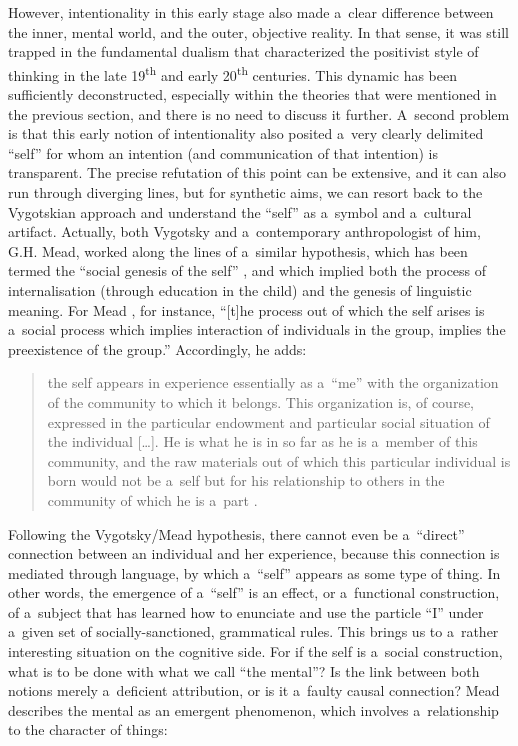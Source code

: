 However, intentionality in this early stage also made a~clear difference between the inner, mental world, and the outer, objective reality. In that sense, it was still trapped in the fundamental dualism that characterized the positivist style of thinking in the late 19\textsuperscript{th} and early 20\textsuperscript{th} centuries. This dynamic has been sufficiently deconstructed, especially within the theories that were mentioned in the previous section, and there is no need to discuss it further. A~second problem is that this early notion of intentionality also posited a~very clearly delimited ``self'' for whom an intention (and communication of that intention) is transparent. The precise refutation of this point can be extensive, and it can also run through diverging lines, but for synthetic aims, we can resort back to the Vygotskian approach and understand the ``self'' as a~symbol and a~cultural artifact. Actually, both Vygotsky and a~contemporary anthropologist of him, G.H. Mead, worked along the lines of a~similar hypothesis, which has been termed the ``social genesis of the self''
\parencite[][]{glock_vygotsky_1986}, %
 and which implied both the process of internalisation (through education in the child) and the genesis of linguistic meaning. For Mead 
\parencite*[][p.164]{mead_mind_1972}, %
 for instance, ``[t]he process out of which the self arises is a~social process which implies interaction of individuals in the group, implies the preexistence of the group.'' Accordingly, he adds:

\begin{quotation}
the self appears in experience essentially as a~``me'' with the organization of the community to which it belongs. This organization is, of course, expressed in the particular endowment and particular social situation of the individual […]. He is what he is in so far as he is a~member of this community, and the raw materials out of which this particular individual is born would not be a~self but for his relationship to others in the community of which he is a~part
\parencite[][p.200]{mead_mind_1972}.%


\end{quotation}
Following the Vygotsky/Mead hypothesis, there cannot even be a~``direct'' connection between an individual and her experience, because this connection is mediated through language, by which a~``self'' appears as some type of thing. In other words, the emergence of a~``self'' is an effect, or a~functional construction, of a~subject that has learned how to enunciate and use the particle ``I'' under a~given set of socially-sanctioned, grammatical rules. This brings us to a~rather interesting situation on the cognitive side. For if the self is a~social construction, what is to be done with what we call ``the mental''? Is the link between both notions merely a~deficient attribution, or is it a~faulty causal connection? Mead describes the mental as an emergent phenomenon, which involves a~relationship to the character of things:

